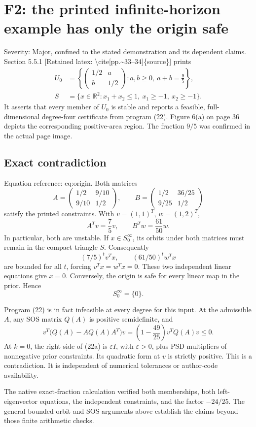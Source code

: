 \documentclass[10pt]{article}
\begin{document}
\section*{F2: the printed infinite-horizon example has only the origin safe}
Severity: Major, confined to the stated demonstration and its dependent claims. Section 5.5.1 [Retained latex: \textbackslash{}cite[pp.\textasciitilde{}33--34]\{source\}] prints \[\begin{aligned}
 U_0&=\left\{
 \begin{pmatrix}1/2&a\\b&1/2\end{pmatrix}:
 a,b\ge0,\ a+b=\frac95\right\},\\
 S&=\{x\in\mathbb R^2:x_1+x_2\le1,\ x_1\ge-1,\ x_2\ge-1\}.\end{aligned}\] It asserts that every member of \(U_0\) is stable and reports a feasible, full-dimensional degree-four certificate from program (22). Figure 6(a) on page 36 depicts the corresponding positive-area region. The fraction \(9/5\) was confirmed in the actual page image.\par
\subsection*{Exact contradiction}
Equation reference: eq:origin. Both matrices \[A=\begin{pmatrix}1/2&9/10\\9/10&1/2\end{pmatrix},
 \qquad
 B=\begin{pmatrix}1/2&36/25\\9/25&1/2\end{pmatrix}\] satisfy the printed constraints. With \(v=(1,1)^T\), \(w=(1,2)^T\), \[A^Tv=\frac75v,\qquad B^Tw=\frac{61}{50}w.\] In particular, both are unstable. If \(x\in S_0^\infty\), its orbits under both matrices must remain in the compact triangle \(S\). Consequently \[(7/5)^t v^Tx,\qquad (61/50)^t w^Tx\] are bounded for all \(t\), forcing \(v^Tx=w^Tx=0\). These two independent linear equations give \(x=0\). Conversely, the origin is safe for every linear map in the prior. Hence \[S_0^\infty=\{0\}.
 \]\par
Program (22) is in fact infeasible at every degree for this input. At the admissible \(A\), any SOS matrix \(Q(A)\) is positive semidefinite, and \[v^T\bigl(Q(A)-AQ(A)A^T\bigr)v
 =\left(1-\frac{49}{25}\right)v^TQ(A)v\le0.\] At \(k=0\), the right side of (22a) is \(\varepsilon I\), with \(\varepsilon>0\), plus PSD multipliers of nonnegative prior constraints. Its quadratic form at \(v\) is strictly positive. This is a contradiction. It is independent of numerical tolerances or author-code availability.\par
The native exact-fraction calculation verified both memberships, both left-eigenvector equations, the independent constraints, and the factor \(-24/25\). The general bounded-orbit and SOS arguments above establish the claims beyond those finite arithmetic checks.\par
\end{document}
